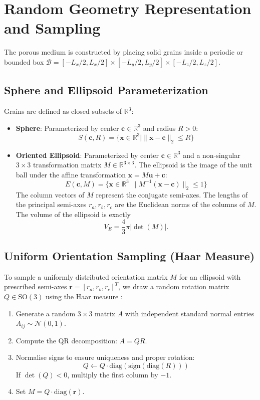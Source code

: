 \documentclass[preprint,12pt]{elsarticle}
\newcommand{\R}{\mathbb{R}}
\newcommand{\x}{\mathbf{x}}
\newcommand{\uvec}{\mathbf{u}}
\newcommand{\cvec}{\mathbf{c}}
\begin{document}
\section{Random Geometry Representation and Sampling}
\label{sec:geometry}

The porous medium is constructed by placing solid grains inside a periodic or bounded box $\mathcal{B} = [-L_x/2, L_x/2] \times [-L_y/2, L_y/2] \times [-L_z/2, L_z/2]$.

\subsection{Sphere and Ellipsoid Parameterization}
Grains are defined as closed subsets of $\R^3$:
\begin{itemize}
    \item \textbf{Sphere}: Parameterized by center $\cvec \in \R^3$ and radius $R > 0$:
    \begin{equation}
    S(\cvec, R) = \{ \x \in \R^3 \mid \|\x - \cvec\|_2 \le R \}
    \end{equation}
    \item \textbf{Oriented Ellipsoid}: Parameterized by center $\cvec \in \R^3$ and a non-singular $3 \times 3$ transformation matrix $M \in \R^{3 \times 3}$. The ellipsoid is the image of the unit ball under the affine transformation $\x = M\uvec + \cvec$:
    \begin{equation}
    E(\cvec, M) = \{ \x \in \R^3 \mid \| M^{-1} (\x - \cvec) \|_2 \le 1 \}
    \end{equation}
    The column vectors of $M$ represent the conjugate semi-axes. The lengths of the principal semi-axes $r_a, r_b, r_c$ are the Euclidean norms of the columns of $M$. The volume of the ellipsoid is exactly
\[
V_E = \frac{4}{3}\pi |\det(M)|.
\]
\end{itemize}

\subsection{Uniform Orientation Sampling (Haar Measure)}
To sample a uniformly distributed orientation matrix $M$ for an ellipsoid with prescribed semi-axes $\mathbf{r} = [r_a, r_b, r_c]^T$, we draw a random rotation matrix $Q \in \text{SO}(3)$ using the Haar measure \citep{ozols2009haar}:
\begin{enumerate}
    \item Generate a random $3 \times 3$ matrix $A$ with independent standard normal entries $A_{ij} \sim \mathcal{N}(0, 1)$.
    \item Compute the QR decomposition: $A = QR$.
    \item Normalise signs to ensure uniqueness and proper rotation:
    \begin{equation}
    Q \leftarrow Q \cdot \text{diag}(\text{sign}(\text{diag}(R)))
    \end{equation}
    If $\det(Q) < 0$, multiply the first column by $-1$.
    \item Set $M = Q \cdot \text{diag}(\mathbf{r})$.
\end{enumerate}
\end{document}
